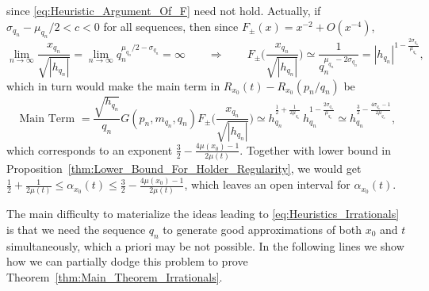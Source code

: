 \documentclass[11pt,reqno]{amsart}
\theoremstyle{definition}
\begin{document}
since \eqref{eq:Heuristic_Argument_Of_F}
need not hold. 
Actually, 
if $\sigma_{q_n} - \mu_{q_n}/2 < c < 0$ for all sequences, then since $F_\pm(x) = x^{-2} + O(x^{-4})$, 
\begin{equation}
\lim_{n \to \infty} \frac{x_{q_n}}{\sqrt{|h_{q_n}|}} 
= \lim_{n \to \infty} q_n^{\mu_{q_n}/2 - \sigma_{q_n}} = \infty 
\qquad \Longrightarrow \qquad 
F_\pm\Big( \frac{x_{q_n}}{\sqrt{|h_{q_n}|}} \Big) 
\simeq \frac{1}{q_n^{\mu_{q_n} - 2\sigma_{q_n}} } 
= |h_{q_n}|^{ 1 - \frac{2\sigma_{q_n}}{\mu_{q_n}} },
\end{equation}
which in turn would make the main term in $R_{x_0} (t) - R_{x_0}(p_n/q_n)$ be
\begin{equation}
\text{ Main Term } 
=  \frac{\sqrt{h_{q_n}}}{q_n} G(p_n,m_{q_n},q_n) F_\pm\Big( \frac{x_{q_n}}{\sqrt{|h_{q_n}|}} \Big)
\simeq h_{q_n}^{ \frac12 + \frac{1}{2\mu_{q_n} } } \, h_{q_n}^{ 1 - \frac{2\sigma_{q_n}}{\mu_{q_n}} }
\simeq h_{q_n}^{\frac32 - \frac{4\sigma_{q_n} - 1}{2\mu_{q_n}}},
\end{equation}
which corresponds to an exponent $\frac32 -  \frac{4\mu(x_0) - 1}{2\mu(t)}$. 
Together with lower bound in 
Proposition~\ref{thm:Lower_Bound_For_Holder_Regularity}, 
 we would get
$ \frac12 + \frac{1}{2\mu(t)} \leq \alpha_{x_0}(t) \leq \frac32 -  \frac{4\mu(x_0) - 1}{2\mu(t)} $, 
which leaves an open interval for $ \alpha_{x_0}(t) $. 

The main difficulty to materialize the ideas
leading to \eqref{eq:Heuristics_Irrationals}
is that we need the sequence $q_n$ to generate good approximations of both $x_0$ and $t$ simultaneously, 
which a priori may be not possible. 
In the following lines 
we show how we can partially dodge this problem 
to prove Theorem~\ref{thm:Main_Theorem_Irrationals}. 
\end{document}
